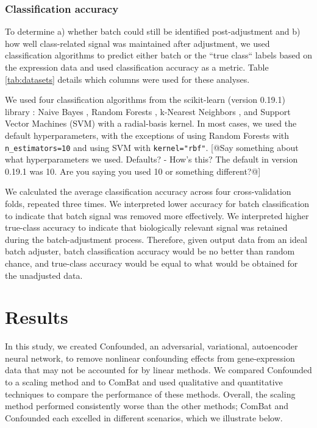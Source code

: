 \documentclass[11pt]{article}
\begin{document}
\subsubsection{Classification accuracy}

To determine
a) whether batch could still be identified post-adjustment and
b) how well class-related signal was maintained after adjustment,
we used classification algorithms to predict either batch or the ``true class`` labels based on the expression data and used classification accuracy as a metric.
Table \ref{tab:datasets} details which columns were used for these analyses.

We used four classification algorithms from the scikit-learn (version 0.19.1) library \cite{pedregosa_scikit-learn_2011}: Naive Bayes \citep{maron_automatic_1961}, Random Forests \citep{tin_kam_ho_random_1995}, k-Nearest Neighbors \citep{fix_discriminatory_1951}, and Support Vector Machines (SVM) \citep{cortes_support-vector_1995} with a radial-basis kernel.
In most cases, we used the default hyperparameters, with the exceptions of using Random Forests with \texttt{n\_estimators=10} and using SVM with \texttt{kernel="rbf"}.
[@Say something about what hyperparameters we used. Defaults? - How's this? The default in version 0.19.1 was 10. Are you saying you used 10 or something different?@]

We calculated the average classification accuracy across four cross-validation folds, repeated three times.
We interpreted lower accuracy for batch classification to indicate that batch signal was removed more effectively.
We interpreted higher true-class accuracy to indicate that biologically relevant signal was retained during the batch-adjustment process.
Therefore, given output data from an ideal batch adjuster, batch classification accuracy would be no better than random chance, and true-class accuracy would be equal to what would be obtained for the unadjusted data.

\section{Results} \label{sec:results}

In this study, we created Confounded, an adversarial, variational, autoencoder neural network, to remove nonlinear confounding effects from gene-expression data that may not be accounted for by linear methods.
We compared Confounded to a scaling method and to ComBat \citep{johnson_adjusting_2007} and used qualitative and quantitative techniques to compare the performance of these methods.
Overall, the scaling method performed consistently worse than the other methods;
ComBat and Confounded each excelled in different scenarios, which we illustrate below.
\end{document}
